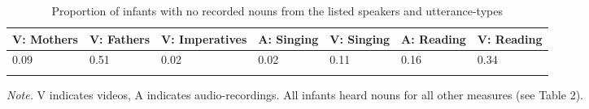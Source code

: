 \documentclass[man]{apa6}
\theoremstyle{definition}
\theoremstyle{definition}
\theoremstyle{definition}
\theoremstyle{remark}
\begin{document}
\begin{table}[tbp]
\begin{center}
\begin{threeparttable}
\caption{\label{tab:propna-missing-tables}Proportion of infants with no recorded nouns from the listed speakers and utterance-types}
\small{
\begin{tabular}{lllllll}
\toprule
V: Mothers & \multicolumn{1}{c}{V: Fathers} & \multicolumn{1}{c}{V: Imperatives} & \multicolumn{1}{c}{A: Singing} & \multicolumn{1}{c}{V: Singing} & \multicolumn{1}{c}{A: Reading} & \multicolumn{1}{c}{V: Reading}\\
\midrule
0.09 & 0.51 & 0.02 & 0.02 & 0.11 & 0.16 & 0.34\\
\bottomrule
\addlinespace
\end{tabular}
}
\begin{tablenotes}[para]
\textit{Note.} V indicates videos, A indicates audio-recordings. All infants heard nouns for all other measures (see Table 2).
\end{tablenotes}
\end{threeparttable}
\end{center}
\end{table}

\pagebreak
\end{document}
